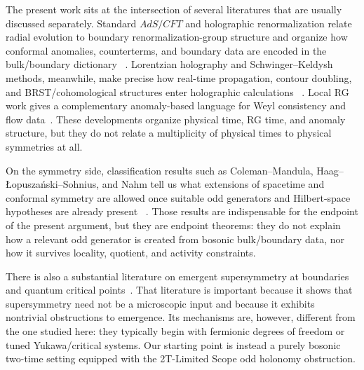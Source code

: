 \documentclass[
  aps,
  prd,
  onecolumn,
  notitlepage,
  nofootinbib,
  superscriptaddress,
  10pt
]{revtex4-2}
\theoremstyle{definition}
\theoremstyle{plain}
\begin{document}
The present work sits at the intersection of several literatures that are
usually discussed separately.  Standard \(AdS/CFT\) and holographic
renormalization relate radial evolution to boundary renormalization-group
structure and organize how conformal anomalies, counterterms, and boundary data
are encoded in the bulk/boundary dictionary
~\cite{Maldacena1998,GubserKlebanovPolyakov1998,Witten1998AdSCFT,HenningsonSkenderis1998,deHaroSkenderisSolodukhin2001,Skenderis2002HR}.
Lorentzian holography and Schwinger--Keldysh methods, meanwhile, make precise
how real-time propagation, contour doubling, and BRST/cohomological structures
enter holographic calculations
~\cite{Schwinger1961,Keldysh1964,SkenderisVanRees2008,SkenderisVanRees:2009RealtimeRenorm,HaehlLoganayagamRangamani:2016SKBRST}.
Local RG work gives a complementary anomaly-based language for Weyl consistency
and flow data~\cite{Osborn1991LocalRG,Nakayama2015LocalRG}.  These developments
organize physical time, RG time, and anomaly structure, but they do not relate a multiplicity of physical times to physical symmetries at all.

On the symmetry side, classification results such as
Coleman--Mandula, Haag--\L opusza\'nski--Sohnius, and Nahm tell us what
extensions of spacetime and conformal symmetry are allowed once suitable odd
generators and Hilbert-space hypotheses are already present
~\cite{ColemanMandula1967,HaagLopuszanskiSohnius1975,Nahm1978}.  Those results
are indispensable for the endpoint of the present argument, but they are
endpoint theorems: they do not explain how a relevant odd generator is created
from bosonic bulk/boundary data, nor how it survives locality, quotient, and
activity constraints.

There is also a substantial literature on emergent supersymmetry at boundaries
and quantum critical points~\cite{GroverShengVishwanath2014,FeiGiombiKlebanovTarnopolsky2016,ZhaoLiu2019}.
That literature is important because it shows that supersymmetry need not be a
microscopic input and because it exhibits nontrivial obstructions to emergence.
Its mechanisms are, however, different from the one studied here: they
typically begin with fermionic degrees of freedom or tuned Yukawa/critical
systems.  Our starting point is instead a purely bosonic two-time setting
equipped with the 2T-Limited Scope odd holonomy obstruction.
\end{document}
